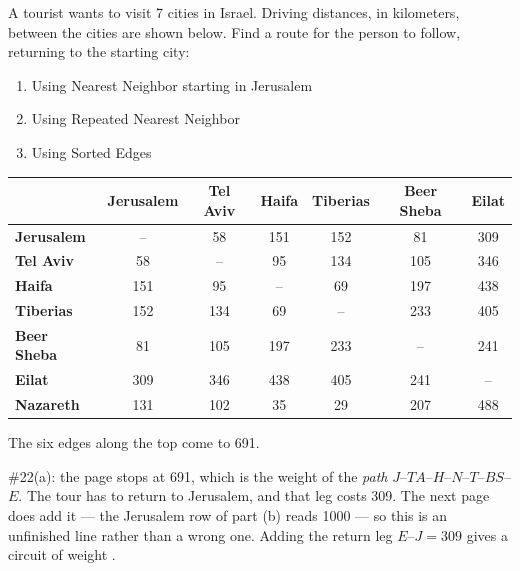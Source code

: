 \begin{stmt}
A tourist wants to visit 7 cities in Israel. Driving distances, in kilometers, between the cities
are shown below. Find a route for the person to follow, returning to the starting city:

\begin{enumerate}[label=\alph*., nosep]
\item Using Nearest Neighbor starting in Jerusalem
\item Using Repeated Nearest Neighbor
\item Using Sorted Edges
\end{enumerate}

\begin{center}\small
\begin{tabular}{|l|c|c|c|c|c|c|}
\hline
& \textbf{Jerusalem} & \textbf{Tel Aviv} & \textbf{Haifa} & \textbf{Tiberias} & \textbf{Beer Sheba} & \textbf{Eilat} \\
\hline
\textbf{Jerusalem}  & --  & 58  & 151 & 152 & 81  & 309 \\
\textbf{Tel Aviv}   & 58  & --  & 95  & 134 & 105 & 346 \\
\textbf{Haifa}      & 151 & 95  & --  & 69  & 197 & 438 \\
\textbf{Tiberias}   & 152 & 134 & 69  & --  & 233 & 405 \\
\textbf{Beer Sheba} & 81  & 105 & 197 & 233 & --  & 241 \\
\textbf{Eilat}      & 309 & 346 & 438 & 405 & 241 & --  \\
\textbf{Nazareth}   & 131 & 102 & 35  & 29  & 207 & 488 \\
\hline
\end{tabular}
\end{center}
\end{stmt}

\begin{sol}
\begin{center}\end{center}

\vspace{0.3em}
The six edges along the top come to 691.

\begin{corr}{\#22(a): the page stops at 691, which is the weight of the \emph{path} $J$--$TA$--$H$--$N$--$T$--$BS$--$E$. The tour has to return to Jerusalem, and that leg costs 309. The next page does add it --- the Jerusalem row of part (b) reads 1000 --- so this is an unfinished line rather than a wrong one.}
Adding the return leg $E$--$J = 309$ gives a circuit of weight .
\end{corr}
\end{sol}


